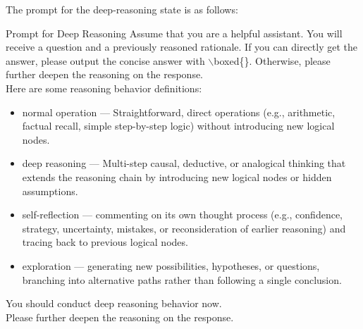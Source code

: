 The prompt for the deep-reasoning state is as follows:
\begin{PromptBox}{Prompt for Deep Reasoning}
  Assume that you are a helpful assistant. You will receive a question and a previously reasoned rationale. If you can directly get the answer, please output the concise answer with $\backslash$boxed\{\}. Otherwise, please further deepen the reasoning on the response.\\

Here are some reasoning behavior definitions:
\begin{itemize}[leftmargin=16pt, itemsep=0pt, topsep=0pt]
    \item normal operation — Straightforward, direct operations (e.g., arithmetic, factual recall, simple step-by-step logic) without introducing new logical nodes.
    \item deep reasoning — Multi-step causal, deductive, or analogical thinking that extends the reasoning chain by introducing new logical nodes or hidden assumptions.
    \item self-reflection — commenting on its own thought process (e.g., confidence, strategy, uncertainty, mistakes, or reconsideration of earlier reasoning) and tracing back to previous logical nodes.
    \item exploration — generating new possibilities, hypotheses, or questions, branching into alternative paths rather than following a single conclusion.
\end{itemize}

You should conduct deep reasoning behavior now.\\

Please further deepen the reasoning on the response.
\end{PromptBox}


